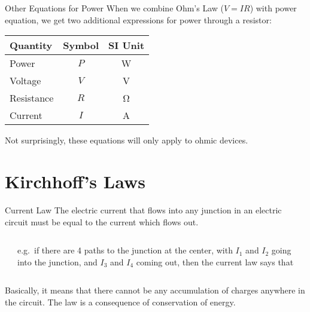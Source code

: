 \documentclass[12pt,aspectratio=169]{beamer}
\newcommand{\eq}[2]{\vspace{#1}{\Large\begin{displaymath}#2\end{displaymath}}}
\begin{document}
\begin{frame}{Other Equations for Power}
  When we combine Ohm's Law ($V=IR$) with power equation, we get two additional
  expressions for power through a resistor:

  \eq{-.15in}{
    \boxed{P=\frac{V^2}{R}}\quad\boxed{P=I^2R}
  }
  \begin{center}
    \begin{tabular}{l|c|c}
      \rowcolor{pink}
      \textbf{Quantity} & \textbf{Symbol} & \textbf{SI Unit} \\ \hline
      Power      & $P$ & \si{\watt} \\
      Voltage    & $V$ & \si{\volt} \\
      Resistance & $R$ & \si{\ohm}  \\
      Current    & $I$ & \si{\ampere}
    \end{tabular}
  \end{center}
  Not surprisingly, these equations will only apply to ohmic devices.
\end{frame}


\section{Kirchhoff's Laws}

\begin{frame}{Current Law}
  The electric current that flows into any junction in an electric circuit must
  be equal to the current which flows out.

  \vspace{.2in}
  \begin{columns}
    \begin{center}
    \end{center}
    
    e.g.\ if there are 4 paths to the junction at the center, with $I_1$ and
    $I_2$ going into the junction, and $I_3$ and $I_4$ coming out, then the
    current law says that

    \eq{-.3in}{
      I_1+I_2-I_3-I_4=0
    }
  \end{columns}

  \vspace{.2in}Basically, it means that there cannot be any accumulation of
  charges anywhere in the circuit. The law is a consequence of conservation of
  energy.
\end{frame}
\end{document}
